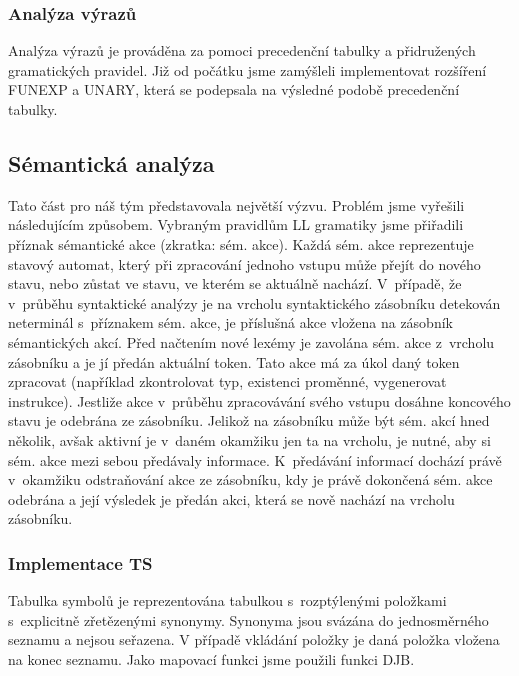 \documentclass[a4paper,11pt,leqno]{article}
\begin{document}
\subsubsection{Analýza výrazů}
Analýza výrazů je prováděna za pomoci precedenční tabulky a přidružených gramatických pravidel.
Již od počátku jsme zamýšleli implementovat rozšíření FUNEXP a UNARY,
která se podepsala na výsledné podobě precedenční tabulky.
\subsection{Sémantická analýza}
Tato část pro náš tým představovala největší výzvu.
Problém jsme vyřešili následujícím způsobem. Vybraným pravidlům LL gramatiky jsme
přiřadili příznak sémantické akce (zkratka: sém. akce).
Každá sém. akce reprezentuje stavový automat, který při zpracování jednoho vstupu může přejít do nového stavu, nebo zůstat ve stavu, ve kterém se aktuálně nachází.
V~případě, že v~průběhu syntaktické analýzy je
na vrcholu syntaktického zásobníku detekován neterminál s~příznakem sém. akce,
je příslušná akce vložena na zásobník sémantických akcí.
Před načtením nové lexémy je zavolána sém. akce z~vrcholu zásobníku a je jí předán
aktuální token. Tato akce má za úkol daný token zpracovat
(například zkontrolovat typ, existenci proměnné, vygenerovat instrukce).
Jestliže akce v~průběhu zpracovávání
svého vstupu dosáhne koncového stavu je odebrána ze zásobníku.
Jelikož na zásobníku může být sém.
akcí hned několik, avšak aktivní je v~daném okamžiku jen ta na vrcholu,
je nutné, aby si sém. akce mezi sebou předávaly informace.
K~předávání informací dochází právě v~okamžiku odstraňování akce ze
zásobníku, kdy je právě dokončená sém. akce odebrána a její výsledek je předán akci, která se nově nachází na vrcholu zásobníku.
\subsubsection{Implementace TS}
Tabulka symbolů je reprezentována tabulkou s~rozptýlenými položkami s~explicitně
zřetězenými synonymy. Synonyma jsou svázána do jednosměrného seznamu a nejsou
seřazena. V případě vkládání položky je daná položka vložena na konec seznamu. Jako mapovací funkci jsme použili funkci DJB.
\end{document}
